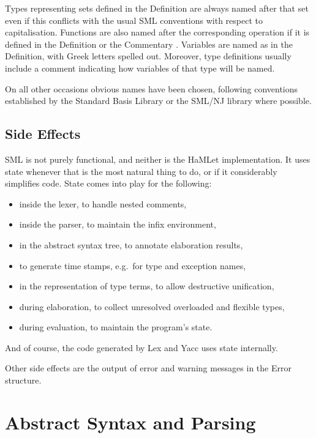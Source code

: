 \documentclass[twoside,titlepage]{article}
\begin{document}
Types representing sets defined in the Definition are always named after that set even if this conflicts with the usual SML conventions with respect to capitalisation. Functions are also named after the corresponding operation if it is defined in the Definition or the Commentary \cite{commentary}. Variables are named as in the Definition, with Greek letters spelled out. Moreover, type definitions usually include a comment indicating how variables of that type will be named.

On all other occasions obvious names have been chosen, following conventions established by the Standard Basis Library \cite{basis} or the SML/NJ library \cite{njlib} where possible.


\subsection{Side Effects}
\label{sideeffects}

SML is not purely functional, and neither is the HaMLet implementation. It uses state whenever that is the most natural thing to do, or if it considerably simplifies code. State comes into play for the following:

\begin{itemize}[nolistsep]
\item inside the lexer, to handle nested comments,
\item inside the parser, to maintain the infix environment,
\item in the abstract syntax tree, to annotate elaboration results,
\item to generate time stamps, e.g.\ for type and exception names,
\item in the representation of type terms, to allow destructive unification,
\item during elaboration, to collect unresolved overloaded and flexible types,
\item during evaluation, to maintain the program's state.
\end{itemize}

And of course, the code generated by Lex and Yacc uses state internally.

Other side effects are the output of error and warning messages in the Error structure.



\section{Abstract Syntax and Parsing}
\label{parsing}
\end{document}
